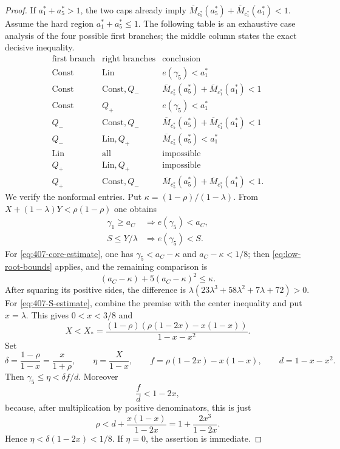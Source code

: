 \begin{proof}
If $a_1^\ast+a_5^\ast>1$, the two caps already imply
$\overline M_{c_5^\ast}(a_5^\ast)+\overline M_{c_1^\ast}(a_1^\ast)<1$.  Assume the hard region
$a_1^\ast+a_5^\ast\le1$.  The following table is an exhaustive case analysis of the four
possible first branches; the middle column states the exact decisive
inequality.
\[
\begin{array}{c|c|c}
\text{first branch}&\text{right branches}&\text{conclusion}\\ \hline
\mathrm{Const}&\mathrm{Lin}&e(\gamma_5)<a_1^\ast\\
\mathrm{Const}&\mathrm{Const},Q_-&\overline M_{c_5^\ast}(a_5^\ast)+\overline M_{c_1^\ast}(a_1^\ast)<1\\
\mathrm{Const}&Q_+&e(\gamma_5)<a_1^\ast\\
Q_-&\mathrm{Const},Q_-&\overline M_{c_5^\ast}(a_5^\ast)+\overline M_{c_1^\ast}(a_1^\ast)<1\\
Q_-&\mathrm{Lin},Q_+&\overline M_{c_5^\ast}(a_5^\ast)<a_1^\ast\\
\mathrm{Lin}&\text{all}&\text{impossible}\\
Q_+&\mathrm{Lin},Q_+&\text{impossible}\\
Q_+&\mathrm{Const},Q_-&\overline M_{c_5^\ast}(a_5^\ast)+\overline M_{c_1^\ast}(a_1^\ast)<1.
\end{array}
\]
We verify the nonformal entries.  Put
$\kappa=(1-\rho)/(1-\lambda)$.  From
$X+(1-\lambda)Y<\rho(1-\rho)$ one obtains
\begin{align}
 \gamma_1\ge a_C&\Longrightarrow e(\gamma_5)<a_C,
 \label{eq:407-core-estimate}\\
 S\le Y/\lambda&\Longrightarrow e(\gamma_5)<S.
 \label{eq:407-S-estimate}
\end{align}
For \eqref{eq:407-core-estimate}, one has
$\gamma_5<a_C-\kappa$ and
$a_C-\kappa<1/8$; then \eqref{eq:low-root-bounds} applies, and the remaining
comparison is
\[
 (a_C-\kappa)+5(a_C-\kappa)^2\le\kappa.
\]
After squaring its positive sides, the difference is
$\lambda(23\lambda^3+58\lambda^2+7\lambda+72)>0$.
For \eqref{eq:407-S-estimate}, combine the premise with the center
inequality and put $x=\lambda$.  This gives $0<x<3/8$ and
\[
 X<X_*=\frac{(1-\rho)(\rho(1-2x)-x(1-x))}{1-x-x^2}.
\]
Set
\[
 \delta=\frac{1-\rho}{1-x}=\frac{x}{1+\rho},\qquad
 \eta=\frac{X}{1-x},\qquad
 f=\rho(1-2x)-x(1-x),\qquad d=1-x-x^2.
\]
Then $\gamma_5\le\eta<\delta f/d$.  Moreover
\[
 \frac fd<1-2x,
\]
because, after multiplication by positive denominators, this is just
\[
 \rho<d+\frac{x(1-x)}{1-2x}
 =1+\frac{2x^3}{1-2x}.
\]
Hence $\eta<\delta(1-2x)<1/8$.  If $\eta=0$, the assertion is immediate.

\end{proof}
